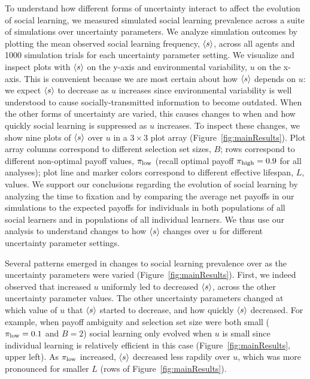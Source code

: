 \documentclass[letterpaper,11.5pt]{scrartcl}
\begin{document}
To understand how different forms of uncertainty interact to affect the evolution
of social learning, we measured simulated social learning prevalence across a 
suite of simulations over uncertainty parameters. We analyze simulation outcomes
by plotting the mean observed social learning frequency, $\langle s \rangle$, across all agents 
and 1000 simulation trials for each uncertainty parameter setting. 
We visualize and inspect plots with $\langle s \rangle$ on the y-axis and
environmental variability, $u$ on the x-axis. This is convenient because we are
most certain about how $\langle s \rangle$ depends on $u$: we expect $\langle s \rangle$ to decrease
as $u$ increases since environmental variability is well understood to cause
socially-transmitted information to become outdated. When the other forms of
uncertainty are varied, this causes changes to when and how quickly social learning
is suppressed as $u$ increases. To inspect these changes, we show nine plots
of $\langle s \rangle$ over $u$ in a $3\times3$ plot array (Figure~\ref{fig:mainResults}). 
Plot array columns correspond to different selection set sizes, $B$; rows
correspond to different non-optimal payoff values, $\pi_{\mathrm{low}}$ (recall optimal
payoff $\pi_{\mathrm{high}}=0.9$ for all analyses); plot line and marker colors correspond
to different effective lifespan, $L$, values. 
We support our conclusions regarding the evolution of
social learning by analyzing the time to 
fixation and by comparing the average net payoffs in our simulations to the
expected payoffs for individuals in both populations of all social learners
and in populations of all individual learners. We thus use our analysis 
to understand changes to how $\langle s \rangle$ changes over $u$ for different uncertainty parameter settings.

Several patterns emerged in changes to social learning prevalence over
as the uncertainty parameters were varied (Figure~\ref{fig:mainResults}). 
First, we indeed observed that increased $u$ uniformly led to decreased
$\langle s \rangle$, across the other uncertainty parameter values. The other uncertainty
parameters changed at which value of $u$ that $\langle s \rangle$ started to decrease,
and how quickly $\langle s \rangle$ decreased. For example, 
when payoff ambiguity and selection set size were
both small ($\pi_{\mathrm{low}} = 0.1$ and $B=2$) social learning only evolved when $u$ is small
since individual learning is relatively efficient in this case
(Figure~\ref{fig:mainResults}, upper left). As $\pi_{\mathrm{low}}$ increased,
$\langle s \rangle$ decreased less rapdily over $u$, which was more pronounced for smaller $L$ (rows of
Figure~\ref{fig:mainResults}).  
\end{document}
